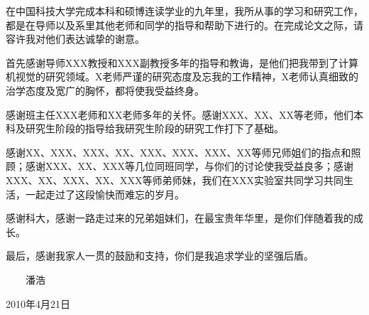 
\begin{thanks}

在中国科技大学完成本科和硕博连读学业的九年里，我所从事的学习和研究工作，都是在导师以及系里其他老师和同学的指导和帮助下进行的。在完成论文之际，请容许我对他们表达诚挚的谢意。

首先感谢导师XXX教授和XXX副教授多年的指导和教诲，是他们把我带到了计算机视觉的研究领域。X老师严谨的研究态度及忘我的工作精神，X老师认真细致的治学态度及宽广的胸怀，都将使我受益终身。

感谢班主任XXX老师和XX老师多年的关怀。感谢XXX、XX、XX等老师，他们本科及研究生阶段的指导给我研究生阶段的研究工作打下了基础。

感谢XX、XXX、XXX、XX、XXX、XXX、XXX、XX等师兄师姐们的指点和照顾；感谢XXX、XX、XXX等几位同班同学，与你们的讨论使我受益良多；感谢XXX、XX、XXX、XX、XXX等师弟师妹，我们在XXX实验室共同学习共同生活，一起走过了这段愉快而难忘的岁月。

感谢科大，感谢一路走过来的兄弟姐妹们，在最宝贵年华里，是你们伴随着我的成长。

最后，感谢我家人一贯的鼓励和支持，你们是我追求学业的坚强后盾。

\vskip 18pt

\begin{flushright}

~~~~潘浩~~~~

2010年4月21日

\end{flushright}

\end{thanks}
